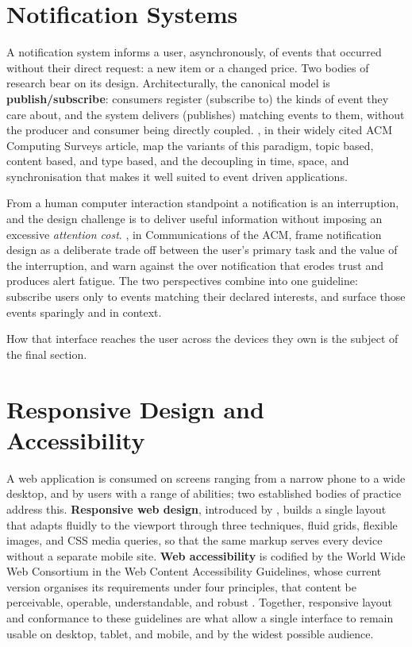 \section{Notification Systems}

A notification system informs a user, asynchronously, of events that occurred without their direct request: a new item or a changed price. Two bodies of research bear on its design. Architecturally, the canonical model is \textbf{publish/subscribe}: consumers register (subscribe to) the kinds of event they care about, and the system delivers (publishes) matching events to them, without the producer and consumer being directly coupled. \textcite{Eugster2003PubSub}, in their widely cited ACM Computing Surveys article, map the variants of this paradigm, topic based, content based, and type based, and the decoupling in time, space, and synchronisation that makes it well suited to event driven applications.

From a human computer interaction standpoint a notification is an interruption, and the design challenge is to deliver useful information without imposing an excessive \emph{attention cost}. \textcite{McCrickardChewar2003}, in Communications of the ACM, frame notification design as a deliberate trade off between the user's primary task and the value of the interruption, and warn against the over notification that erodes trust and produces alert fatigue. The two perspectives combine into one guideline: subscribe users only to events matching their declared interests, and surface those events sparingly and in context.

How that interface reaches the user across the devices they own is the subject of the final section.

\section{Responsive Design and Accessibility}

A web application is consumed on screens ranging from a narrow phone to a wide desktop, and by users with a range of abilities; two established bodies of practice address this. \textbf{Responsive web design}, introduced by \textcite{Marcotte2011}, builds a single layout that adapts fluidly to the viewport through three techniques, fluid grids, flexible images, and CSS media queries, so that the same markup serves every device without a separate mobile site. \textbf{Web accessibility} is codified by the World Wide Web Consortium in the Web Content Accessibility Guidelines, whose current version organises its requirements under four principles, that content be perceivable, operable, understandable, and robust \parencite{WCAG22}. Together, responsive layout and conformance to these guidelines are what allow a single interface to remain usable on desktop, tablet, and mobile, and by the widest possible audience.

